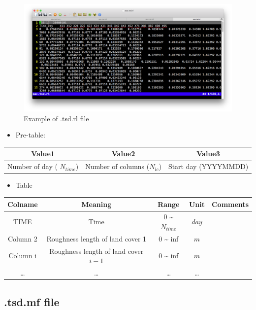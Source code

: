 \documentclass[
]{scrbook}
\providecommand{\tightlist}{%
  \setlength{\itemsep}{0pt}\setlength{\parskip}{0pt}}
\begin{document}
\begin{figure}
\centering
\includegraphics{Fig/IO/tsd.rl.png}
\caption{Example of .tsd.rl file}
\end{figure}

\begin{itemize}
\tightlist
\item
  Pre-table:
\end{itemize}

\begin{longtable}[]{@{}ccc@{}}
\toprule
Value1 & Value2 & Value3\tabularnewline
\midrule
\endhead
Number of day ( \(N_{time}\)) & Number of columns (\(N_{lc}\)) & Start day (YYYYMMDD)\tabularnewline
\bottomrule
\end{longtable}

\begin{itemize}
\tightlist
\item
  Table
\end{itemize}

\begin{longtable}[]{@{}ccccc@{}}
\toprule
Colname & Meaning & Range & Unit & Comments\tabularnewline
\midrule
\endhead
TIME & Time & 0 \textasciitilde{} \(N_{time}\) & \(day\) &\tabularnewline
Column 2 & Roughness length of land cover 1 & 0 \textasciitilde{} inf & \(m\) &\tabularnewline
Column i & Roughness length of land cover \(i-1\) & 0 \textasciitilde{} inf & \(m\) &\tabularnewline
\ldots{} & \ldots{} & \ldots{} & \ldots{} &\tabularnewline
\bottomrule
\end{longtable}

\hypertarget{tsd.mf-file}{%
\subsection{.tsd.mf file}\label{tsd.mf-file}}
\end{document}
